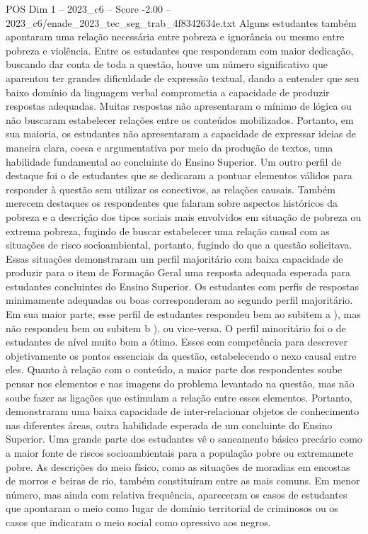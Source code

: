 \begin{textsample}{POS Dim 1 – 2023\_c6 – Score -2.00 – 2023\_c6/enade\_2023\_tec\_seg\_trab\_4f8342634e.txt}
Alguns estudantes também apontaram uma relação necessária entre pobreza e ignorância ou mesmo entre pobreza e violência.
Entre os estudantes que responderam com maior dedicação, buscando dar conta de toda a questão, houve um número significativo que aparentou ter grandes dificuldade de expressão textual, dando a entender que seu baixo domínio da linguagem verbal comprometia a capacidade de produzir respostas adequadas.
Muitas respostas não apresentaram o mínimo de lógica ou não buscaram estabelecer relações entre os conteúdos mobilizados.
Portanto, em sua maioria, os estudantes não apresentaram a capacidade de expressar ideias de maneira clara, coesa e argumentativa por meio da produção de textos, uma habilidade fundamental ao concluinte do Ensino Superior.
Um outro perfil de destaque foi o de estudantes que se dedicaram a pontuar elementos válidos para responder à questão sem utilizar os conectivos, as relações causais.
Também merecem destaques os respondentes que falaram sobre aspectos históricos da pobreza e a descrição dos tipos sociais mais envolvidos em situação de pobreza ou extrema pobreza, fugindo de buscar estabelecer uma relação causal com as situações de risco socioambiental, portanto, fugindo do que a questão solicitava.
Essas situações demonstraram um perfil majoritário com baixa capacidade de produzir para o item de Formação Geral uma resposta adequada esperada para estudantes concluintes do Ensino Superior.
Os estudantes com perfis de respostas minimamente adequadas ou boas corresponderam ao segundo perfil majoritário.
Em sua maior parte, esse perfil de estudantes respondeu bem ao subitem a ), mas não respondeu bem ou subitem b ), ou vice-versa.
O perfil minoritário foi o de estudantes de nível muito bom a ótimo.
Esses com competência para descrever objetivamente os pontos essenciais da questão, estabelecendo o nexo causal entre eles.
Quanto à relação com o conteúdo, a maior parte dos respondentes soube pensar nos elementos e nas imagens do problema levantado na questão, mas não soube fazer as ligações que estimulam a relação entre esses elementos.
Portanto, demonstraram uma baixa capacidade de inter-relacionar objetos de conhecimento nas diferentes áreas, outra habilidade esperada de um concluinte do Ensino Superior.
Uma grande parte dos estudantes vê o saneamento básico precário como a maior fonte de riscos socioambientais para a população pobre ou extremamete pobre.
As descrições do meio físico, como as situações de moradias em encostas de morros e beiras de rio, também constituíram entre as mais comuns.
Em menor número, mas ainda com relativa frequência, apareceram os casos de estudantes que apontaram o meio como lugar de domínio territorial de criminosos ou os casos que indicaram o meio social como opressivo aos negros.

\end{textsample}
